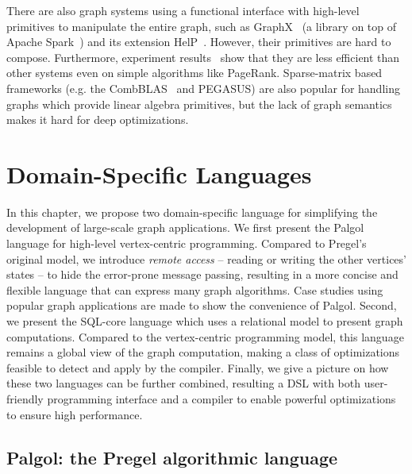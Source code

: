 \documentclass{sokendai_thesis} %
\begin{document}
There are also graph systems using a functional interface with high-level primitives to manipulate the entire graph, such as GraphX~\cite{graphx} (a library on top of Apache Spark~\cite{spark}) and its extension HelP~\cite{help}.
However, their primitives are hard to compose.
Furthermore, experiment results~\cite{husky} show that they are less efficient than other systems even on simple algorithms like PageRank.
Sparse-matrix based frameworks (e.g. the CombBLAS~\cite{combblas} and PEGASUS\cite{pegasus}) are also popular for handling graphs which provide linear algebra primitives, but the lack of graph semantics makes it hard for deep optimizations.


\chapter{Domain-Specific Languages}
\label{chap:dsl}

In this chapter, we propose two domain-specific language for simplifying the development of large-scale graph applications.
We first present the Palgol language for high-level vertex-centric programming.
Compared to Pregel's original model, we introduce \emph{remote access} -- reading or writing the other vertices' states -- to hide the error-prone message passing, resulting in a more concise and flexible language that can express many graph algorithms.
Case studies using popular graph applications are made to show the convenience of Palgol.
Second, we present the SQL-core language which uses a relational model to present graph computations.
Compared to the vertex-centric programming model, this language remains a global view of the graph computation, making a class of optimizations feasible to detect and apply by the compiler.
Finally, we give a picture on how these two languages can be further combined, resulting a DSL with both user-friendly programming interface and a compiler to enable powerful optimizations to ensure high performance.

\section{Palgol: the Pregel algorithmic language}
\end{document}
